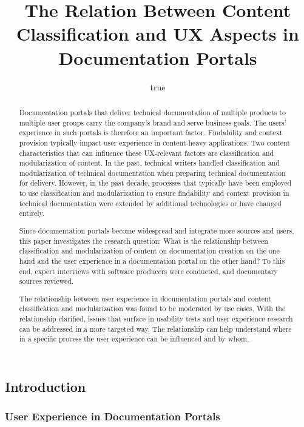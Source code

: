 \documentclass[
]{article}
\title{The Relation Between Content Classification and UX Aspects in
Documentation Portals}
\author{true}
\date{}
\begin{document}
\maketitle
\begin{abstract}
Documentation portals that deliver technical documentation of multiple
products to multiple user groups carry the company's brand and serve
business goals. The users' experience in such portals is therefore an
important factor. Findability and context provision typically impact
user experience in content-heavy applications. Two content
characteristics that can influence these UX-relevant factors are
classification and modularization of content. In the past, technical
writers handled classification and modularization of technical
documentation when preparing technical documentation for delivery.
However, in the past decade, processes that typically have been employed
to use classification and modularization to ensure findability and
context provision in technical documentation were extended by additional
technologies or have changed entirely.

Since documentation portals become widespread and integrate more sources
and users, this paper investigates the research question: What is the
relationship between classification and modularization of content on
documentation creation on the one hand and the user experience in a
documentation portal on the other hand? To this end, expert interviews
with software producers were conducted, and documentary sources
reviewed.

The relationship between user experience in documentation portals and
content classification and modularization was found to be moderated by
use cases. With the relationship clarified, issues that surface in
usability tests and user experience research can be addressed in a more
targeted way. The relationship can help understand where in a specific
process the user experience can be influenced and by whom.
\end{abstract}

\renewcommand*\contentsname{Contents}
{
\setcounter{tocdepth}{3}
\tableofcontents
}
\subsection{Introduction}\label{introduction}

\subsubsection{User Experience in Documentation
Portals}\label{user-experience-in-documentation-portals}
\end{document}
